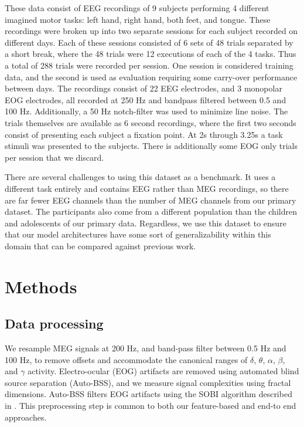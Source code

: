 \documentclass[utf8]{frontiersSCNS} %
\newcommand{\FR}[1]{{\small \textcolor{red}{\hl{FR: #1}}}}
\begin{document}
These data consist of EEG recordings of 9 subjects performing 4 different imagined motor tasks: left hand, right hand, both feet, and tongue. These recordings were broken up into two separate sessions for each subject recorded on different days. Each of these sessions consisted of 6 sets of 48 trials separated by a short break, where the 48 trials were 12 executions of each of the 4 tasks. Thus a total of 288 trials were recorded per session. One session is considered training data, and the second is used as evaluation requiring some carry-over performance between days. The recordings consist of 22 EEG electrodes, and 3 monopolar EOG electrodes, all recorded at 250 Hz and bandpass filtered between 0.5 and 100 Hz. Additionally, a 50 Hz notch-filter was used to minimize line noise. The trials themselves are available as 6 second recordings, where the first two seconds consist of presenting each subject a fixation point. At 2s through 3.25s a task stimuli was presented to the subjects. There is additionally some EOG only trials per session that we discard. %

There are several challenges to using this dataset as a benchmark. It uses a different task entirely and contains EEG rather than MEG recordings, so there are far fewer EEG channels than the number of MEG channels from our primary dataset. The participants also come from a different population than the children and adolescents of our primary data. Regardless, we use this dataset to ensure that our model architectures have some sort of generalizability within this domain that can be compared against previous work. 

\section{Methods}


\subsection{Data processing}

We resample MEG signals at 200 Hz, and band-pass filter between 0.5 Hz and 100 Hz, to remove offsets and accommodate the canonical ranges of $\delta$, $\theta$, $\alpha$, $\beta$, and $\gamma$ activity. Electro-ocular (EOG) artifacts are removed using automated blind source separation (Auto-BSS), and we measure signal complexities using fractal dimensions. Auto-BSS filters EOG artifacts using the SOBI algorithm described in \cite{eog}. This preprocessing step is common to both our feature-based and end-to end approaches.
\end{document}
